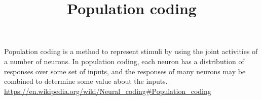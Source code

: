 \documentclass[a4paper]{article}
\title{Population coding}
\date{}
\begin{document}
    \maketitle
    Population coding is a method to represent stimuli by using the joint activities of a number of neurons. In population coding, each neuron has a distribution of responses over some set of inputs, and the responses of many neurons may be combined to determine some value about the inputs.
    \url{https://en.wikipedia.org/wiki/Neural_coding#Population_coding}
\end{document}
